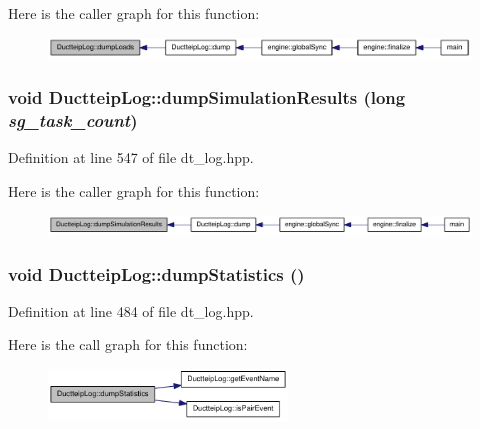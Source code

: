 Here is the caller graph for this function:\nopagebreak
\begin{figure}[H]
\begin{center}
\leavevmode
\includegraphics[width=317pt]{class_ductteip_log_a26e1bca52b880675a247a54cca4a6b1f_icgraph}
\end{center}
\end{figure}
\hypertarget{class_ductteip_log_af6f835d866e252bb637b95f75e816835}{
\subsubsection[{dumpSimulationResults}]{\setlength{\rightskip}{0pt plus 5cm}void DuctteipLog::dumpSimulationResults (long {\em sg\_\-task\_\-count})}}
\label{class_ductteip_log_af6f835d866e252bb637b95f75e816835}


Definition at line 547 of file dt\_\-log.hpp.

Here is the caller graph for this function:\nopagebreak
\begin{figure}[H]
\begin{center}
\leavevmode
\includegraphics[width=344pt]{class_ductteip_log_af6f835d866e252bb637b95f75e816835_icgraph}
\end{center}
\end{figure}
\hypertarget{class_ductteip_log_a7f6153345afe4d8ecf0e4f066c77fb33}{
\subsubsection[{dumpStatistics}]{\setlength{\rightskip}{0pt plus 5cm}void DuctteipLog::dumpStatistics ()}}
\label{class_ductteip_log_a7f6153345afe4d8ecf0e4f066c77fb33}


Definition at line 484 of file dt\_\-log.hpp.

Here is the call graph for this function:\nopagebreak
\begin{figure}[H]
\begin{center}
\leavevmode
\includegraphics[width=180pt]{class_ductteip_log_a7f6153345afe4d8ecf0e4f066c77fb33_cgraph}
\end{center}
\end{figure}


